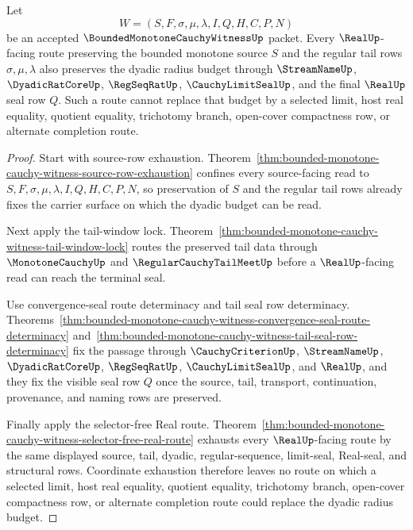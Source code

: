 \begin{theorem}
\label{thm:bounded-monotone-cauchy-witness-dyadic-radius-budget-preservation}
Let
$$
W=(S,F,\sigma,\mu,\lambda,I,Q,H,C,P,N)
$$
be an accepted $\BoundedMonotoneCauchyWitnessUp$ packet. Every $\RealUp$-facing route preserving the bounded monotone source $S$ and the regular tail rows $\sigma,\mu,\lambda$ also preserves the dyadic radius budget through $\StreamNameUp$, $\DyadicRatCoreUp$, $\RegSeqRatUp$, $\CauchyLimitSealUp$, and the final $\RealUp$ seal row $Q$. Such a route cannot replace that budget by a selected limit, host real equality, quotient equality, trichotomy branch, open-cover compactness row, or alternate completion route.
\end{theorem}
\begin{proof}
Start with source-row exhaustion. Theorem~\ref{thm:bounded-monotone-cauchy-witness-source-row-exhaustion} confines every source-facing read to $S,F,\sigma,\mu,\lambda,I,Q,H,C,P,N$, so preservation of $S$ and the regular tail rows already fixes the carrier surface on which the dyadic budget can be read.

Next apply the tail-window lock. Theorem~\ref{thm:bounded-monotone-cauchy-witness-tail-window-lock} routes the preserved tail data through $\MonotoneCauchyUp$ and $\RegularCauchyTailMeetUp$ before a $\RealUp$-facing read can reach the terminal seal.

Use convergence-seal route determinacy and tail seal row determinacy. Theorems~\ref{thm:bounded-monotone-cauchy-witness-convergence-seal-route-determinacy} and~\ref{thm:bounded-monotone-cauchy-witness-tail-seal-row-determinacy} fix the passage through $\CauchyCriterionUp$, $\StreamNameUp$, $\DyadicRatCoreUp$, $\RegSeqRatUp$, $\CauchyLimitSealUp$, and $\RealUp$, and they fix the visible seal row $Q$ once the source, tail, transport, continuation, provenance, and naming rows are preserved.

Finally apply the selector-free Real route. Theorem~\ref{thm:bounded-monotone-cauchy-witness-selector-free-real-route} exhausts every $\RealUp$-facing route by the same displayed source, tail, dyadic, regular-sequence, limit-seal, Real-seal, and structural rows. Coordinate exhaustion therefore leaves no route on which a selected limit, host real equality, quotient equality, trichotomy branch, open-cover compactness row, or alternate completion route could replace the dyadic radius budget.
\end{proof}

